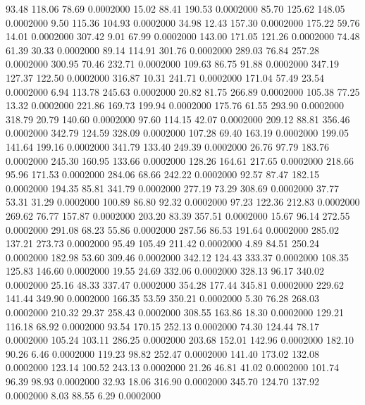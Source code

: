   93.48  118.06   78.69   0.0002000
  15.02   88.41  190.53   0.0002000
  85.70  125.62  148.05   0.0002000
   9.50  115.36  104.93   0.0002000
  34.98   12.43  157.30   0.0002000
 175.22   59.76   14.01   0.0002000
 307.42    9.01   67.99   0.0002000
 143.00  171.05  121.26   0.0002000
  74.48   61.39   30.33   0.0002000
  89.14  114.91  301.76   0.0002000
 289.03   76.84  257.28   0.0002000
 300.95   70.46  232.71   0.0002000
 109.63   86.75   91.88   0.0002000
 347.19  127.37  122.50   0.0002000
 316.87   10.31  241.71   0.0002000
 171.04   57.49   23.54   0.0002000
   6.94  113.78  245.63   0.0002000
  20.82   81.75  266.89   0.0002000
 105.38   77.25   13.32   0.0002000
 221.86  169.73  199.94   0.0002000
 175.76   61.55  293.90   0.0002000
 318.79   20.79  140.60   0.0002000
  97.60  114.15   42.07   0.0002000
 209.12   88.81  356.46   0.0002000
 342.79  124.59  328.09   0.0002000
 107.28   69.40  163.19   0.0002000
 199.05  141.64  199.16   0.0002000
 341.79  133.40  249.39   0.0002000
  26.76   97.79  183.76   0.0002000
 245.30  160.95  133.66   0.0002000
 128.26  164.61  217.65   0.0002000
 218.66   95.96  171.53   0.0002000
 284.06   68.66  242.22   0.0002000
  92.57   87.47  182.15   0.0002000
 194.35   85.81  341.79   0.0002000
 277.19   73.29  308.69   0.0002000
  37.77   53.31   31.29   0.0002000
 100.89   86.80   92.32   0.0002000
  97.23  122.36  212.83   0.0002000
 269.62   76.77  157.87   0.0002000
 203.20   83.39  357.51   0.0002000
  15.67   96.14  272.55   0.0002000
 291.08   68.23   55.86   0.0002000
 287.56   86.53  191.64   0.0002000
 285.02  137.21  273.73   0.0002000
  95.49  105.49  211.42   0.0002000
   4.89   84.51  250.24   0.0002000
 182.98   53.60  309.46   0.0002000
 342.12  124.43  333.37   0.0002000
 108.35  125.83  146.60   0.0002000
  19.55   24.69  332.06   0.0002000
 328.13   96.17  340.02   0.0002000
  25.16   48.33  337.47   0.0002000
 354.28  177.44  345.81   0.0002000
 229.62  141.44  349.90   0.0002000
 166.35   53.59  350.21   0.0002000
   5.30   76.28  268.03   0.0002000
 210.32   29.37  258.43   0.0002000
 308.55  163.86   18.30   0.0002000
 129.21  116.18   68.92   0.0002000
  93.54  170.15  252.13   0.0002000
  74.30  124.44   78.17   0.0002000
 105.24  103.11  286.25   0.0002000
 203.68  152.01  142.96   0.0002000
 182.10   90.26    6.46   0.0002000
 119.23   98.82  252.47   0.0002000
 141.40  173.02  132.08   0.0002000
 123.14  100.52  243.13   0.0002000
  21.26   46.81   41.02   0.0002000
 101.74   96.39   98.93   0.0002000
  32.93   18.06  316.90   0.0002000
 345.70  124.70  137.92   0.0002000
   8.03   88.55    6.29   0.0002000
